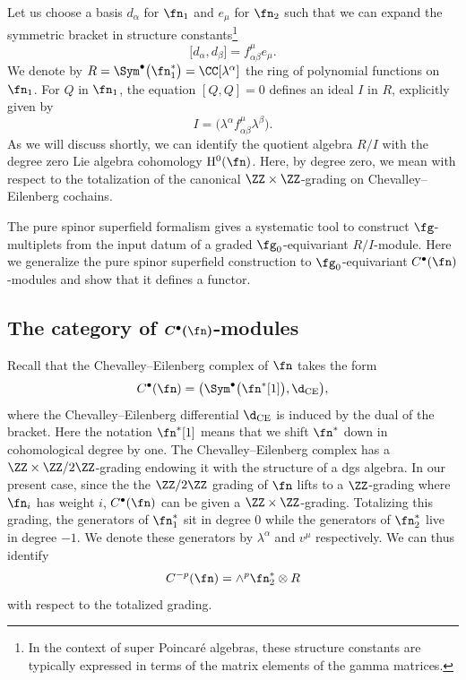 Let us choose a basis $d_\alpha$ for $\fn_1$ and $e_\mu$ for $\fn_2$ such that we can expand the symmetric bracket in structure constants\footnote{In the context of super Poincar\'e algebras, these structure constants are typically expressed in terms of the matrix elements of the gamma matrices.}
\begin{equation*}
\big[d_\alpha , d_\beta \big] = f^\mu_{\alpha \beta} e_\mu .
\end{equation*}
We denote by $R = \Sym^\bullet\big(\fn_1^*\big) = \CC[\lambda^\alpha]$ the ring of polynomial functions on $\fn_1$. For $Q$ in $\fn_1$, the equation $[Q,Q] = 0$ defines an ideal $I$ in $R$, explicitly given by
\begin{equation*}
I = \big(\lambda^\alpha f^\mu_{\alpha \beta} \lambda^\beta \big) .
\end{equation*}
As we will discuss shortly, we can identify the quotient algebra $R/I$ with the degree zero Lie algebra cohomology $\mathrm H^0(\fn)$. Here, by degree zero, we mean with respect to the totalization of the canonical $\ZZ \times \ZZ$-grading on Chevalley--Eilenberg cochains.

The pure spinor superfield formalism gives a systematic tool to construct $\fg$-multiplets from the input datum of a graded $\fg_0$-equivariant $R/I$-module. Here we generalize the pure spinor superfield construction to $\fg_0$-equivariant $C^\bullet(\fn)$-modules and show that it defines a functor.


\subsection[The category of C\^{}bullet(n)-modules]{The category of $\boldsymbol{C^\bullet(\fn)}$-modules} \label{CE_module_section}
Recall that the Chevalley--Eilenberg complex of $\fn$ takes the form
\begin{equation*}
C^\bullet(\fn) = \big( \Sym^\bullet\big(\fn^*[1]\big) , \d_{\mathrm{CE}} \big),
\end{equation*}
where the Chevalley--Eilenberg differential $\d_{\mathrm{CE}}$ is induced by the dual of the bracket. Here the notation $\fn^*[1]$ means that we shift $\fn^*$ down in cohomological degree by one. The Chevalley--Eilenberg complex has a $\ZZ \times \ZZ/2\ZZ$-grading endowing it with the structure of a dgs algebra. In our present case, since the the $\ZZ/2\ZZ$ grading of $\fn$ lifts to a $\ZZ$-grading where $\fn_i$ has weight $i$, $C^\bullet(\fn)$ can be given a $\ZZ \times \ZZ$-grading. Totalizing this grading, the generators of $\fn_1^*$ sit in degree $0$ while the generators of $\fn_2^*$ live in degree $-1$. We denote these generators by $\lambda^\alpha$ and $v^\mu$ respectively. We can thus identify{\samepage
\begin{equation*}
C^{-p}(\fn) = \wedge^p \fn_2^* \otimes R
\end{equation*}
with respect to the totalized grading.}

